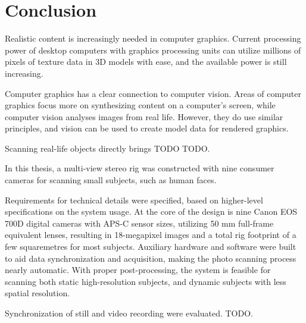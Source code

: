 \section{Conclusion} %

Realistic content is increasingly needed in computer graphics.
Current processing power of desktop computers with graphics processing units can utilize millions of pixels of texture data in 3D models with ease, and the available power is still increasing.

Computer graphics has a clear connection to computer vision.
Areas of computer graphics focus more on synthesizing content on a computer's screen, while computer vision analyses images from real life.
However, they do use similar principles, and vision can be used to create model data for rendered graphics.

Scanning real-life objects directly brings TODO TODO.

In this thesis, a multi-view stereo rig was constructed with nine consumer cameras for scanning small subjects, such as human faces.

Requirements for technical details were specified, based on higher-level specifications on the system usage.
At the core of the design is nine Canon EOS 700D digital cameras with APS-C sensor sizes, utilizing 50 mm full-frame equivalent lenses, resulting in 18-megapixel images and a total rig footprint of a few squaremetres for most subjects.
Auxiliary hardware and software were built to aid data synchronization and acquisition, making the photo scanning process nearly automatic.
With proper post-processing, the system is feasible for scanning both static high-resolution subjects, and dynamic subjects with less spatial resolution.

Synchronization of still and video recording were evaluated. TODO.


